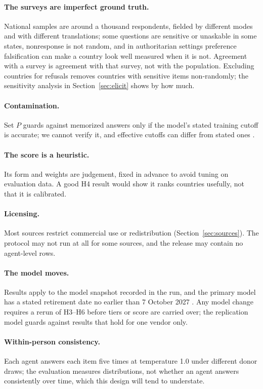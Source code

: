 \documentclass[10pt]{article}
\begin{document}
\paragraph{The surveys are imperfect ground truth.} National samples are around a thousand respondents, fielded by different modes and with different translations; some questions are sensitive or unaskable in some states, nonresponse is not random, and in authoritarian settings preference falsification can make a country look well measured when it is not. Agreement with a survey is agreement with that survey, not with the population. Excluding countries for refusals removes countries with sensitive items non-randomly; the sensitivity analysis in Section~\ref{sec:elicit} shows by how much.

\paragraph{Contamination.} Set $P$ guards against memorized answers only if the model's stated training cutoff is accurate; we cannot verify it, and effective cutoffs can differ from stated ones \citep{cheng2024dated}.

\paragraph{The score is a heuristic.} Its form and weights are judgement, fixed in advance to avoid tuning on evaluation data. A good H4 result would show it ranks countries usefully, not that it is calibrated.

\paragraph{Licensing.} Most sources restrict commercial use or redistribution (Section~\ref{sec:sources}). The protocol may not run at all for some sources, and the release may contain no agent-level rows.

\paragraph{The model moves.} Results apply to the model snapshot recorded in the run, and the primary model has a stated retirement date no earlier than 7 October 2027 \citep{claudemodels}. Any model change requires a rerun of H3--H6 before tiers or score are carried over; the replication model guards against results that hold for one vendor only.

\paragraph{Within-person consistency.} Each agent answers each item five times at temperature 1.0 under different donor draws; the evaluation measures distributions, not whether an agent answers consistently over time, which this design will tend to understate.
\end{document}
